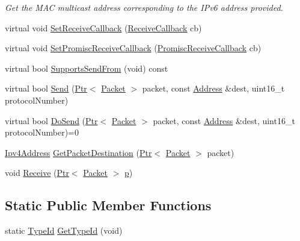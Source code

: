 \begin{DoxyCompactItemize}
\begin{DoxyCompactList}\small\item\em Get the M\+AC multicast address corresponding to the I\+Pv6 address provided. \end{DoxyCompactList}\item 
virtual void \hyperlink{classns3_1_1MmWaveNetDevice_a3920c9a79b529a51200c50077d5089c3}{Set\+Receive\+Callback} (\hyperlink{classns3_1_1NetDevice_ad5e5e1ca187472bc2ba99575d8def568}{Receive\+Callback} cb)
\item 
virtual void \hyperlink{classns3_1_1MmWaveNetDevice_a5b82f15310283d3302fb8a4cb2c153e2}{Set\+Promisc\+Receive\+Callback} (\hyperlink{classns3_1_1NetDevice_a427225795919f26c414bee2ea3f31ed2}{Promisc\+Receive\+Callback} cb)
\item 
virtual bool \hyperlink{classns3_1_1MmWaveNetDevice_af1f25a549c47fb2249a9129a6e6cc30b}{Supports\+Send\+From} (void) const 
\item 
virtual bool \hyperlink{classns3_1_1MmWaveNetDevice_aec4c8d563b6461415de65af8422d9341}{Send} (\hyperlink{classns3_1_1Ptr}{Ptr}$<$ \hyperlink{classns3_1_1Packet}{Packet} $>$ packet, const \hyperlink{classns3_1_1Address}{Address} \&dest, uint16\+\_\+t protocol\+Number)
\item 
virtual bool \hyperlink{classns3_1_1MmWaveNetDevice_af8e4d1ff5e64541b8dc92ee6ac1356c4}{Do\+Send} (\hyperlink{classns3_1_1Ptr}{Ptr}$<$ \hyperlink{classns3_1_1Packet}{Packet} $>$ packet, const \hyperlink{classns3_1_1Address}{Address} \&dest, uint16\+\_\+t protocol\+Number)=0
\item 
\hyperlink{classns3_1_1Ipv4Address}{Ipv4\+Address} \hyperlink{classns3_1_1MmWaveNetDevice_a3cb233818ebeafa8c1dba5595ff98a97}{Get\+Packet\+Destination} (\hyperlink{classns3_1_1Ptr}{Ptr}$<$ \hyperlink{classns3_1_1Packet}{Packet} $>$ packet)
\item 
void \hyperlink{classns3_1_1MmWaveNetDevice_a89410619e5b6def2634940a9ab827d38}{Receive} (\hyperlink{classns3_1_1Ptr}{Ptr}$<$ \hyperlink{classns3_1_1Packet}{Packet} $>$ \hyperlink{lte__link__budget__x2__handover__measures_8m_ac9de518908a968428863f829398a4e62}{p})
\end{DoxyCompactItemize}
\subsection*{Static Public Member Functions}
\begin{DoxyCompactItemize}
\item 
static \hyperlink{classns3_1_1TypeId}{Type\+Id} \hyperlink{classns3_1_1MmWaveNetDevice_ae65f7c28cea2420c27e31c6495d715d3}{Get\+Type\+Id} (void)
\end{DoxyCompactItemize}
